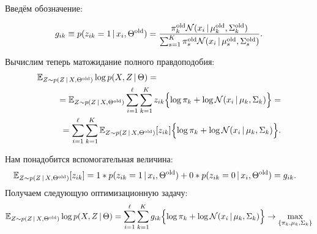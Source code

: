 \documentclass[12pt,a4paper]{article}
\begin{document}
Введём обозначение:

\begin{align*}
g_{ik} \equiv p(z_{ik} = 1 \mspace{3mu}{|}\mspace{3mu} x_i, \Theta^{\text{old}}) = \frac{\pi_k^{\text{old}} \mathcal{N}(x_i \mspace{3mu}{|}\mspace{3mu} \mu_k^{\text{old}}, \Sigma_k^{\text{old}})}{\sum_{s = 1}^{K}\pi_s^{\text{old}} \mathcal{N}(x_i \mspace{3mu}{|}\mspace{3mu} \mu_s^{\text{old}}, \Sigma_s^{\text{old}})}.
\end{align*}

Вычислим теперь матожидание полного правдоподобия:
\begin{align*}
	\mathbb{E}_{Z \sim p(Z \cond X, \Theta^{\text{old}})} \log p(X, Z \cond \Theta) = \phantom{\hspace{5cm}}\\
= \mathbb{E}_{Z \sim p(Z \cond X, \Theta^{\text{old}})} \sum_{i = 1}^{\ell} \sum_{k = 1}^{K} z_{ik}
    \Bigl\{
        \log \pi_k
        +
        \log \NN(x_i \cond \mu_k, \Sigma_k)
    \Bigr\}
=\\
=
\sum_{i = 1}^{\ell}
\sum_{k = 1}^{K}
    \mathbb{E}_{Z \sim p(Z \cond X, \Theta^{\text{old}})}
        [z_{ik}]
    \Bigl\{
        \log \pi_k
        +
        \log \NN(x_i \cond \mu_k, \Sigma_k)
    \Bigr\}.
\end{align*}

Нам понадобится вспомогательная величина:
\begin{align*}
\mathbb{E}_{Z \sim p(Z \mspace{3mu}{|}\mspace{3mu} X, \Theta^{\text{old}})}[z_{ik}] &= 1 * p(z_{ik} = 1 \mspace{3mu}{|}\mspace{3mu} x_i, \Theta^{\text{old}}) + 0 * p(z_{ik} = 0 \mspace{3mu}{|}\mspace{3mu} x_i, \Theta^{\text{old}}) = g_{ik}.
\end{align*}
Получаем следующую оптимизационную задачу:
\[
\mathbb{E}_{Z \sim p(Z \mspace{3mu}{|}\mspace{3mu} X, \Theta^{\text{old}})} \log p(X, Z \mspace{3mu}{|}\mspace{3mu} \Theta)   =
\sum_{i = 1}^{\ell}
\sum_{k = 1}^{K}
    g_{ik}
    \Bigl\{
        \log \pi_k
        +
        \log \mathcal{N}(x_i \mspace{3mu}{|}\mspace{3mu} \mu_k, \Sigma_k)
    \Bigr\} \to \max_{\{\pi_k, \mu_k, \Sigma_k\}}
\]
\end{document}
